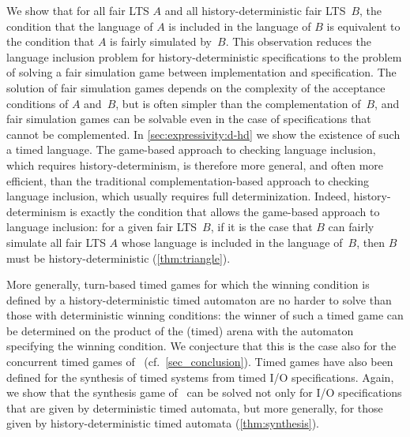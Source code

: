 \documentclass[10pt,a4paper]{amsart}
\theoremstyle{definition}
\numberwithin{equation}{section}
\begin{document}
We show that for all fair LTS $A$ and all history-deterministic fair LTS~$B$,
the condition that the language of $A$ is included in the language of $B$ is
equivalent to the condition that $A$ is fairly simulated by~$B$.
This observation reduces the language inclusion problem for history-deterministic
specifications to the problem of solving a fair simulation game between
implementation and specification.
The solution of fair simulation games depends on the complexity of the acceptance
conditions of $A$ and~$B$, but is often simpler than the complementation of~$B$,
and fair simulation games can be solvable even in the case of specifications that
cannot be complemented.
In \cref{sec:expressivity:d-hd} we show the existence of such a timed language.
The game-based approach to checking language inclusion,
which requires history-determinism,
is therefore more general, and often more efficient,
than the traditional complementation-based approach to checking language inclusion,
which usually requires full determinization.
Indeed, history-determinism is exactly the condition that allows the game-based
approach to language inclusion:
for a given fair LTS~$B$, if it is the case that $B$ can fairly simulate all fair
LTS $A$ whose language is included in the language of~$B$,
then $B$ must be history-deterministic (\cref{thm:triangle}).


More generally, turn-based timed games for which the winning
condition is defined by a history-deterministic timed automaton are no harder to solve than those with deterministic winning conditions:
the winner of such a timed game can be determined on the product of the (timed)
arena with the automaton specifying the winning condition.
We conjecture that this is the case
also for the concurrent timed games of~\cite{DFHM03}
(cf.~\cref{sec_conclusion}).
Timed games have also been defined for the synthesis of timed systems from timed I/O
specifications.
Again, we show that the synthesis game of~\cite{DM2002} can be solved not only for
I/O specifications that are given by deterministic timed automata,
but more generally, for those given by history-deterministic
timed automata (\cref{thm:synthesis}).
\end{document}
